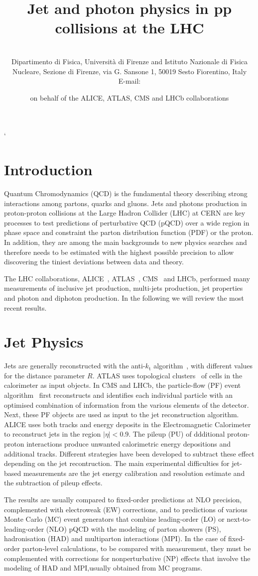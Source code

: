 \documentclass{PoS}
\title{Jet and photon physics in pp collisions at the LHC}
\author{\speaker{ Vitaliano Ciulli } %
\\ Dipartimento di Fisica, Universit\`a di Firenze and Istituto
Nazionale di Fisica Nucleare, Sezione di Firenze, via G. Sansone 1, 50019 Sesto Fiorentino, Italy \\ E-mail:
\email{vitaliano.ciulli@fi.infn.it}} \author{on behalf of the ALICE, ATLAS, CMS and LHCb collaborations}
\providecommand{\kts}{\ensuremath{k_{\mathrm{t}}}\xspace}
\begin{document}
`
\section{Introduction}

Quantum Chromodynamics (QCD) is the fundamental theory describing strong interactions among partons, \ie quarks and
gluons. Jets and photons production in proton-proton collisions at the Large Hadron Collider (LHC) at CERN are key processes to test predictions of
perturbative QCD (pQCD) over a wide region in phase space and constraint the parton distribution function (PDF) or the
proton. In addition, they are among the main backgrounds to new physics searches and therefore needs to be estimated with the
highest possible precision to allow discovering the tiniest deviations between data and theory.

The LHC collaborations, ALICE~, ATLAS~\cite{Aad:2008zzm}, CMS~\cite{Chatrchyan:2008aa} and LHCb, performed many
measurements of inclusive jet production, multi-jets production, jet properties and photon and diphoton production. 
In the following we will review the most recent results.

\section{Jet Physics}

Jets are generally reconstructed with the anti-\kts algorithm~\cite{Cacciari:2008gp}, with different values for the distance parameter $R$.
ATLAS uses topological clusters~\cite{Lampl:2008zz} of cells in the calorimeter as input objects. 
In CMS and LHCb, the particle-flow (PF) event algorithm~\cite{CMS:2009nxa}
first reconstructs and identifies each individual particle with an optimised
combination of information from the various elements of the detector. Next, these PF objects are used as input to the jet
reconstruction algorithm. ALICE uses both tracks and energy deposits in the
Electromagnetic Calorimeter to reconstruct jets in the region $|\eta|<0.9$.
The pileup (PU) of ddditional proton-proton interactions produce unwanted calorimetric energy depositions and additional
tracks. Different strategies have been developed to subtract these effect depending on the jet recontruction.
The main experimental difficulties for jet-based measurements are the jet energy calibration and resolution estimate and the subtraction of pileup
effects. 

The results are usually compared to fixed-order predictions at NLO precision, complemented with electroweak (EW) corrections, and to predictions of
various Monte Carlo (MC) event generators that combine leading-order (LO) or next-to-leading-order (NLO) pQCD with the modeling of parton
showers (PS), hadronisation (HAD) and multiparton interactions (MPI).
In the case of fixed-order parton-level calculations, to be compared with measurement, they must be complemented with corrections for nonperturbative
(NP) effects that involve the modeling of HAD and MPI,usually obtained from MC programs. 
\end{document}
